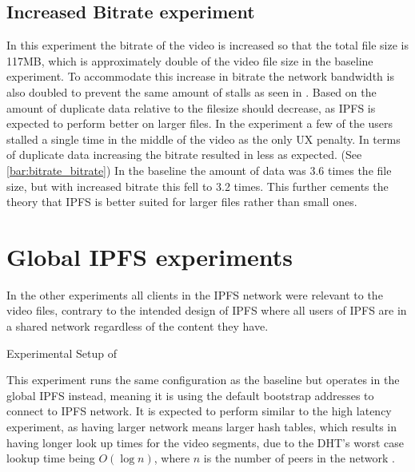 \subsection{Increased Bitrate experiment}
In this experiment the bitrate of the video is increased so that the total file size is 117\ac{MB}, which is approximately double of the video file size in the baseline experiment. To accommodate this increase in bitrate the network bandwidth is also doubled to prevent the same amount of stalls as seen in . Based on  the amount of duplicate data relative to the filesize should decrease, as \ac{IPFS} is expected to perform better on larger files.
In the experiment a few of the users stalled a single time in the middle of the video as the only \ac{UX} penalty. In terms of duplicate data increasing the bitrate resulted in less as expected. (See \autoref{bar:bitrate_bitrate}) In the baseline the amount of data was 3.6 times the file size, but with increased bitrate this fell to 3.2 times. This further cements the theory that \ac{IPFS} is better suited for larger files rather than small ones.

\if{}

\fi

\FloatBarrier \section{Global IPFS experiments}
\label{sec:eval_global}

In the other experiments all clients in the \ac{IPFS} network were relevant to the video files, contrary to the intended design of \ac{IPFS} where all users of \ac{IPFS} are in a shared network regardless of the content they have.

\begin{table}[!htbp]
    \myfloatalign
    \caption[Experimental Setup of Global \acs{IPFS}]{Experimental Setup of }
    \label{tab:exp_overview_global}
    
\end{table}

This experiment runs the same configuration as the baseline but operates in the global \ac{IPFS} instead, meaning it is using the default bootstrap addresses to connect to \ac{IPFS} network.
It is expected to perform similar to the high latency experiment, as having larger network means larger hash tables, which results in having longer look up times for the video segments, due to the \ac{DHT}'s worst case lookup time being $ O ( \log n)$, where $n$ is the number of peers in the network \cite[p.2]{benet2014ipfs}.


